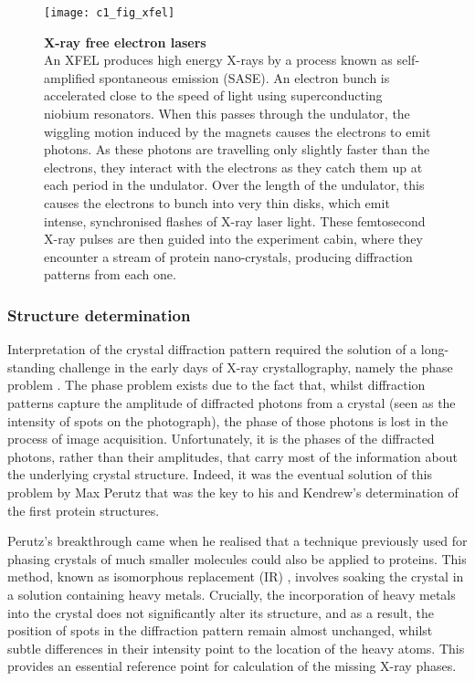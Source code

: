 \documentclass[a4paper,11pt,twoside,openright]{scrbook}
\begin{document}
\begin{figure}[h]
    \texttt{[image: c1\_fig\_xfel]}
    \caption[X-ray free electron lasers]{\sffamily \textbf{X-ray free electron
    lasers} \\ \small An XFEL produces high energy X-rays by a process known as
    self-amplified spontaneous emission (SASE). An electron bunch is accelerated
    close to the speed of light using superconducting niobium resonators. When
    this passes through the undulator, the wiggling motion induced by the
    magnets causes the electrons to emit photons. As these photons are
    travelling only slightly faster than the electrons, they interact with the
    electrons as they catch them up at each period in the undulator. Over the
    length of the undulator, this causes the electrons to bunch into very thin
    disks, which emit intense, synchronised flashes of X-ray laser light. These
    femtosecond X-ray pulses are then guided into the experiment cabin, where
    they encounter a stream of protein nano-crystals, producing diffraction
    patterns from each one.}
    \label{figure:xfels}
\end{figure}

\subsubsection{Structure determination}
Interpretation of the crystal diffraction pattern required the solution of a
long-standing challenge in the early days of X-ray crystallography, namely the
phase problem \cite{Taylor2003}. The phase problem exists due to the fact that,
whilst diffraction patterns capture the amplitude of diffracted photons from a
crystal (seen as the intensity of spots on the photograph), the phase of those
photons is lost in the process of image acquisition. Unfortunately, it is the
phases of the diffracted photons, rather than their amplitudes, that carry most
of the information about the underlying crystal structure. Indeed, it was the
eventual solution of this problem by Max Perutz that was the key to his and
Kendrew's determination of the first protein structures.

Perutz's breakthrough came when he realised that a technique previously used for
phasing crystals of much smaller molecules could also be applied to proteins.
This method, known as isomorphous replacement (IR)  \cite{Robertson1936},
involves soaking the crystal in a solution containing heavy metals. Crucially,
the incorporation of heavy metals into the crystal does not significantly alter
its structure, and as a result, the position of spots in the diffraction pattern
remain almost unchanged, whilst subtle differences in their intensity point to
the location of the heavy atoms. This provides an essential reference point for
calculation of the missing X-ray phases.
\end{document}
